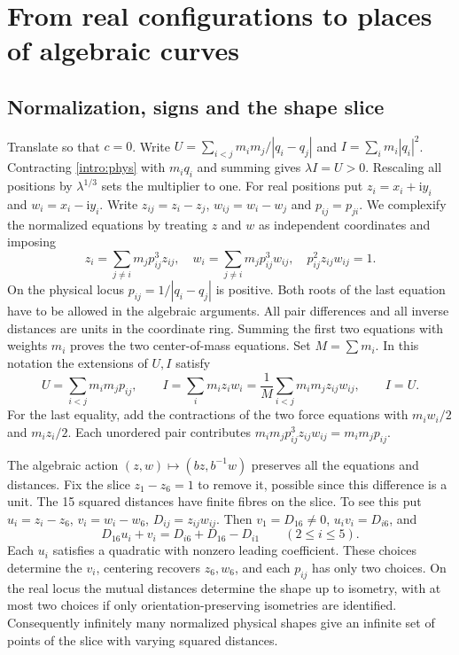 \documentclass[11pt,letterpaper]{article}
\theoremstyle{definition}
\begin{document}
\begingroup
\small
\makeatletter
\renewcommand*{\l@section}{\@dottedtocline{1}{0em}{1.8em}}
\makeatother
\tableofcontents
\endgroup

\section{From real configurations to places of algebraic curves}\label{intro:places}
\subsection{Normalization, signs and the shape slice}
Translate so that $c=0$. Write $U=\sum_{i<j}m_i m_j/|q_i-q_j|$ and $I=\sum_i m_i |q_i|^2$. Contracting \eqref{intro:phys} with $m_iq_i$ and summing gives $\lambda I=U>0$. Rescaling all positions by $\lambda^{1/3}$ sets the multiplier to one. For real positions put $z_i=x_i+\mathrm i y_i$ and $w_i=x_i-\mathrm i y_i$. Write $z_{ij}=z_i-z_j$, $w_{ij}=w_i-w_j$ and $p_{ij}=p_{ji}$. We complexify the normalized equations by treating $z$ and $w$ as independent coordinates and imposing
\begin{equation}\label{intro:signed}
 z_i=\sum_{j\ne i}m_jp_{ij}^3z_{ij},\quad
 w_i=\sum_{j\ne i}m_jp_{ij}^3w_{ij},\quad
 p_{ij}^2 z_{ij}w_{ij}=1 .
\end{equation}
On the physical locus $p_{ij}=1/|q_i-q_j|$ is positive. Both roots of the last equation have to be allowed in the algebraic arguments. All pair differences and all inverse distances are units in the coordinate ring. Summing the first two equations with weights $m_i$ proves the two center-of-mass equations. Set $M=\sum m_i$. In this notation the extensions of $U,I$ satisfy
\begin{equation}\label{intro:energy}
 U=\sum_{i<j}m_im_jp_{ij},\qquad
 I=\sum_i m_i z_i w_i=\frac{1}{M}\sum_{i<j}m_i m_j z_{ij}w_{ij},\qquad I=U .
\end{equation}
For the last equality, add the contractions of the two force equations with $m_i w_i/2$ and $m_i z_i/2$. Each unordered pair contributes $m_i m_jp_{ij}^3z_{ij}w_{ij}=m_i m_jp_{ij}$.

The algebraic action $(z,w)\mapsto(bz,b^{-1}w)$ preserves all the equations and distances. Fix the slice $z_1-z_6=1$ to remove it, possible since this difference is a unit. The 15 squared distances have finite fibres on the slice. To see this put $u_i=z_i-z_6$, $v_i=w_i-w_6$, $D_{ij}=z_{ij}w_{ij}$. Then $v_1=D_{16}\ne0$, $u_i v_i=D_{i6}$, and
\[
 D_{16}u_i+v_i=D_{i6}+D_{16}-D_{i1}\qquad (2\le i\le5).
\]
Each $u_i$ satisfies a quadratic with nonzero leading coefficient. These choices determine the $v_i$, centering recovers $z_6,w_6$, and each $p_{ij}$ has only two choices. On the real locus the mutual distances determine the shape up to isometry, with at most two choices if only orientation-preserving isometries are identified. Consequently infinitely many normalized physical shapes give an infinite set of points of the slice with varying squared distances.
\end{document}
